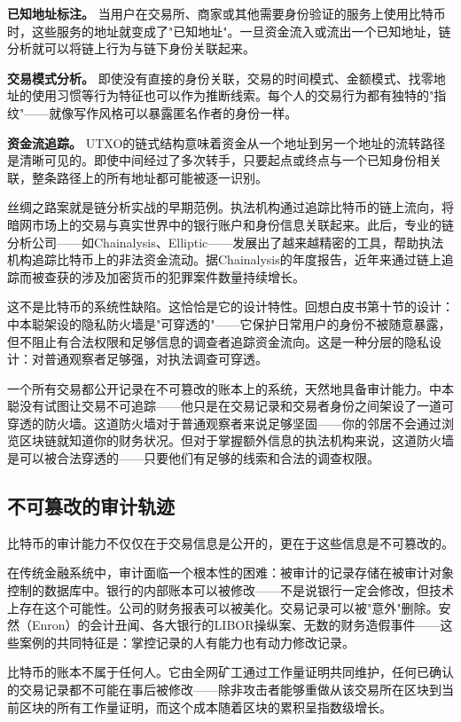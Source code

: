 \documentclass[a4paper,12pt,openany]{ctexbook}
\begin{document}
\textbf{已知地址标注。} 当用户在交易所、商家或其他需要身份验证的服务上使用比特币时，这些服务的地址就变成了"已知地址"。一旦资金流入或流出一个已知地址，链分析就可以将链上行为与链下身份关联起来。

\textbf{交易模式分析。} 即使没有直接的身份关联，交易的时间模式、金额模式、找零地址的使用习惯等行为特征也可以作为推断线索。每个人的交易行为都有独特的"指纹"——就像写作风格可以暴露匿名作者的身份一样。

\textbf{资金流追踪。} UTXO的链式结构意味着资金从一个地址到另一个地址的流转路径是清晰可见的。即使中间经过了多次转手，只要起点或终点与一个已知身份相关联，整条路径上的所有地址都可能被逐一识别。

丝绸之路案就是链分析实战的早期范例。执法机构通过追踪比特币的链上流向，将暗网市场上的交易与真实世界中的银行账户和身份信息关联起来。此后，专业的链分析公司——如Chainalysis、Elliptic——发展出了越来越精密的工具，帮助执法机构追踪比特币上的非法资金流动。据Chainalysis的年度报告，近年来通过链上追踪而被查获的涉及加密货币的犯罪案件数量持续增长。

这不是比特币的系统性缺陷。这恰恰是它的设计特性。回想白皮书第十节的设计：中本聪架设的隐私防火墙是"可穿透的"——它保护日常用户的身份不被随意暴露，但不阻止有合法权限和足够信息的调查者追踪资金流向。这是一种分层的隐私设计：对普通观察者足够强，对执法调查可穿透。

一个所有交易都公开记录在不可篡改的账本上的系统，天然地具备审计能力。中本聪没有试图让交易不可追踪——他只是在交易记录和交易者身份之间架设了一道可穿透的防火墙。这道防火墙对于普通观察者来说足够坚固——你的邻居不会通过浏览区块链就知道你的财务状况。但对于掌握额外信息的执法机构来说，这道防火墙是可以被合法穿透的——只要他们有足够的线索和合法的调查权限。


\subsection*{不可篡改的审计轨迹}


比特币的审计能力不仅仅在于交易信息是公开的，更在于这些信息是不可篡改的。

在传统金融系统中，审计面临一个根本性的困难：被审计的记录存储在被审计对象控制的数据库中。银行的内部账本可以被修改——不是说银行一定会修改，但技术上存在这个可能性。公司的财务报表可以被美化。交易记录可以被"意外"删除。安然（Enron）的会计丑闻、各大银行的LIBOR操纵案、无数的财务造假事件——这些案例的共同特征是：掌控记录的人有能力也有动力修改记录。

比特币的账本不属于任何人。它由全网矿工通过工作量证明共同维护，任何已确认的交易记录都不可能在事后被修改——除非攻击者能够重做从该交易所在区块到当前区块的所有工作量证明，而这个成本随着区块的累积呈指数级增长。
\end{document}
